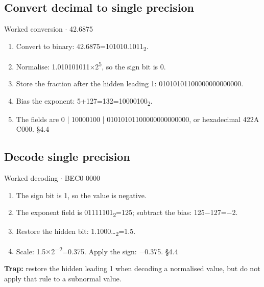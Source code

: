 \documentclass[11pt]{article}
\begin{document}
\begin{keepsection}
\begin{keepsection}
\subsection{Convert decimal to single precision}

\begin{workedbox}{Worked conversion \ensuremath{\cdot} 42.6875}
\begin{enumerate}
\item Convert to binary: 42.6875=101010.1011\textsubscript{2}.
\item Normalise: 1.010101011\ensuremath{\times}2\textsuperscript{5}, so the sign bit is 0.
\item Store the fraction after the hidden leading 1: 01010101100000000000000.
\item Bias the exponent: 5+127=132=10000100\textsubscript{2}.
\item The fields are 0 | 10000100 | 01010101100000000000000, or hexadecimal 422A C000. \hfill{\small\color{FAUblue}§4.4}
\end{enumerate}
\end{workedbox}
\end{keepsection}

\begin{keepsection}
\subsection{Decode single precision}

\begin{workedbox}{Worked decoding \ensuremath{\cdot} BEC0 0000}
\begin{enumerate}
\item The sign bit is 1, so the value is negative.
\item The exponent field is 01111101\textsubscript{2}=125; subtract the bias: 125\ensuremath{-}127=\ensuremath{-}2.
\item Restore the hidden bit: 1.1000…\textsubscript{2}=1.5.
\item Scale: 1.5\ensuremath{\times}2\textsuperscript{\ensuremath{-}2}=0.375. Apply the sign: \ensuremath{-}0.375. \hfill{\small\color{FAUblue}§4.4}
\end{enumerate}
\end{workedbox}

\begin{notebox}\textbf{Trap:} restore the hidden leading 1 when decoding a normalised value, but do not apply that rule to a subnormal value.\end{notebox}


\end{keepsection}
\end{keepsection}
\end{document}
